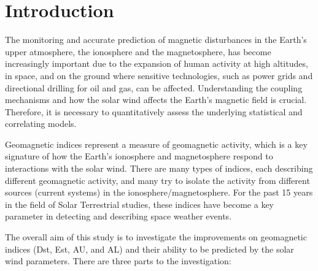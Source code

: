 \documentclass[12pt]{report} %
\begin{document}


\chapter{Introduction} \label{chap:introduction}
\vspace{-10pt}
The monitoring and accurate prediction of magnetic disturbances in the Earth's upper atmosphere, the ionosphere and the magnetosphere, has become increasingly important due to the expansion of human activity at high altitudes, in space, and on the ground where sensitive technologies, such as power grids and directional drilling for oil and gas, can be affected.  Understanding the coupling mechanisms and how the solar wind affects the Earth's magnetic field is crucial. Therefore, it is necessary to quantitatively assess the underlying statistical and correlating models. 

Geomagnetic indices represent a measure of geomagnetic activity, which is a key signature of how the Earth's ionosphere and magnetosphere respond to interactions with the solar wind. There are many types of indices, each describing different geomagnetic activity, and many try to isolate the activity from different sources (current systems) in the ionosphere/magnetosphere. For the past 15 years in the field of Solar Terrestrial studies, these indices have become a key parameter in detecting and describing space weather events.

The overall aim of this study is to investigate the improvements on geomagnetic indices (Dst, Est, AU, and AL) and their ability to be predicted by the solar wind parameters. There are three parts to the investigation:
\end{document}
